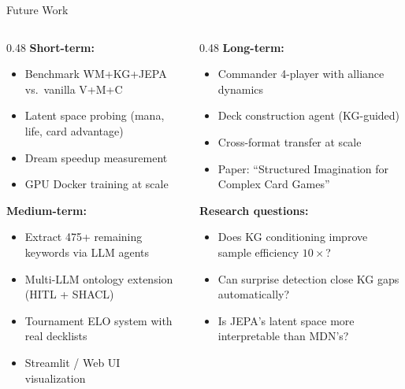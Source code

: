 \documentclass[aspectratio=169, 10pt]{beamer}
\begin{document}
\begin{frame}{Future Work}
  \begin{columns}[T]
    \begin{column}{0.48\textwidth}
      \textbf{Short-term:}
      \begin{itemize}\small
        \item Benchmark WM+KG+JEPA vs.\ vanilla V+M+C
        \item Latent space probing (mana, life, card advantage)
        \item Dream speedup measurement
        \item GPU Docker training at scale
      \end{itemize}
      \vspace{0.3cm}
      \textbf{Medium-term:}
      \begin{itemize}\small
        \item Extract 475+ remaining keywords via LLM agents
        \item Multi-LLM ontology extension (HITL + SHACL)
        \item Tournament ELO system with real decklists
        \item Streamlit / Web UI visualization
      \end{itemize}
    \end{column}
    \begin{column}{0.48\textwidth}
      \textbf{Long-term:}
      \begin{itemize}\small
        \item Commander 4-player with alliance dynamics
        \item Deck construction agent (KG-guided)
        \item Cross-format transfer at scale
        \item Paper: ``Structured Imagination for Complex Card Games''
      \end{itemize}
      \vspace{0.3cm}
      \textbf{Research questions:}
      \begin{itemize}\small
        \item Does KG conditioning improve sample efficiency $10\times$?
        \item Can surprise detection close KG gaps automatically?
        \item Is JEPA's latent space more interpretable than MDN's?
      \end{itemize}
    \end{column}
  \end{columns}
\end{frame}
\end{document}
